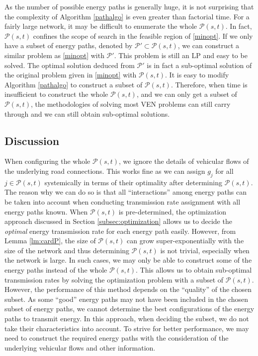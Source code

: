 \documentclass[journal]{IEEEtran}
\begin{document}
As the number of possible energy paths is generally huge, it is not surprising that the complexity of Algorithm \ref{pathalgo} is even greater than factorial time. For a fairly large network, it may be difficult to enumerate the whole $\mathcal{P}(s,t)$. In fact, $\mathcal{P}(s,t)$ confines the scope of search in the feasible region of \eqref{minopt}. If we only have a subset of energy paths, denoted by $\mathcal{P}'\subset\mathcal{P}(s,t)$, we can construct a similar problem as \eqref{minopt} with $\mathcal{P}'$. This problem is still an LP and easy to be solved. The optimal solution deduced from $\mathcal{P}'$ is in fact a sub-optimal solution of the original problem given in \eqref{minopt} with $\mathcal{P}(s,t)$. 
It is easy to modify Algorithm \ref{pathalgo} to construct a subset of $\mathcal{P}(s,t)$.
Therefore, when time is insufficient to construct the whole $\mathcal{P}(s,t)$, and we can only get a subset of $\mathcal{P}(s,t)$, the methodologies of solving most VEN problems can still carry through and we can still obtain sub-optimal solutions.


\subsection{Discussion}
When configuring the whole $\mathcal{P}(s,t)$, we ignore the details of  vehicular flows of the underlying road connections. This works fine as we can assign $g_j$ for all $j\in \mathcal{P}(s,t)$ systemically in terms of their optimality after determining $\mathcal{P}(s,t)$. The reason why we can do so is that all ``interactions'' among energy paths can be taken into account when conducting transmission rate assignment with all energy paths known.
When $\mathcal{P}(s,t)$ is pre-determined, the optimization approach discussed in Section \ref{subsec:optimization} allows us to decide the \textit{optimal} energy transmission rate for each energy path easily. 
However,  from Lemma \ref{lm:cardP}, the size of $\mathcal{P}(s,t)$ can grow super-exponentially with the size of the network and thus  determining $\mathcal{P}(s,t)$ is not trivial, especially when the network is large. In such cases, we may only be able to construct some of the energy paths instead of the whole $\mathcal{P}(s,t)$. 
This allows us to obtain sub-optimal transmission rates by solving the optimization problem with a subset of $\mathcal{P}(s,t)$. However, the performance of this method depends on the ``quality'' of the chosen subset. As some ``good'' energy paths may not have been included in the chosen subset of  energy paths, we cannot determine the best configurations of the energy paths to transmit energy. In this approach, when deciding the subset, we do not take their characteristics into account. 
To strive for better performance, we may need to construct the required energy paths with the consideration of the underlying vehicular flows and other information.
\end{document}
